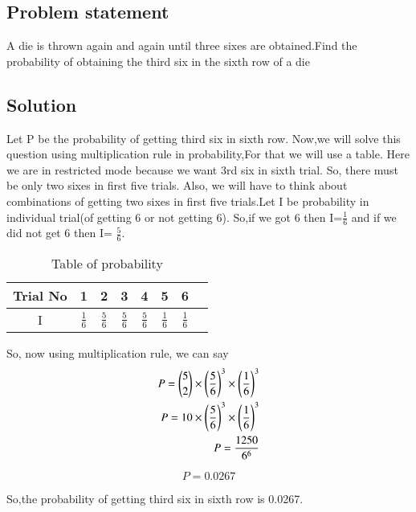 \documentclass[journal,12pt,twocolumn]{IEEEtran}
\begin{document}
 \begin{center}
     \section{\textbf{Problem statement}}
 \end{center}
A die is thrown again and again until three sixes are obtained.Find the probability of obtaining the third six in the sixth row of a die

\begin{center}
    \section{\textbf{Solution}}
\end{center}
 Let P be the probability of getting third six in sixth row.
 \newline
 Now,we will solve this question using multiplication rule in probability,For that we will use a table. Here we are in restricted mode because we want 3rd six in sixth trial. So, there must be only two sixes in first five trials. Also, we will have to think about combinations of getting two sixes in first five trials.Let I be probability in individual trial(of getting 6 or not getting 6). So,if we got 6 then I=$\frac{1}{6}$ and if we did not get 6 then I=
 $\frac{5}{6}$.
\begin{table}[ht]
\centering
\begin{tabular}{|c|c|c|c|c|c|c|c} \hline
    Trial No & 1 & 2 & 3 & 4 & 5 & 6 \\ \hline
    I & $\frac{1}{6}$ &$\frac{5}{6}$ &$\frac{5}{6}$&$\frac{5}{6}$&$\frac{1}{6}$&
   $\frac{1}{6}$ \\ \hline
    \end{tabular}
    \caption{ Table of probability }
    \label{table:1}
\end{table}

So, now using multiplication rule, we can say 
\begin{align}
    P={5 \choose 2} \times \left(\frac{5}{6}\right)^3 \times \left(\frac{1}{6}\right)^3 \\
    P= 10 \times \left(\frac{5}{6}\right)^3 \times \left(\frac{1}{6}\right)^3 \\
    P= \frac{1250}{6^6}
\end{align}

\begin{equation}
    \boxed{P=0.0267}
\end{equation}
   
So,the probability of getting third six in sixth row is 0.0267.
\end{document}
